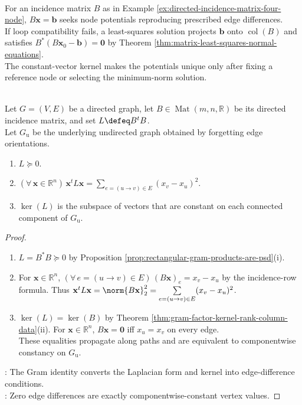 \begin{perspective} \label{per:incidence-least-squares-ranking} \\
For an incidence matrix $B$ as in Example \ref{ex:directed-incidence-matrix-four-node}, $B\mathbf{x}=\mathbf{b}$ seeks node potentials reproducing prescribed edge differences.\\
If loop compatibility fails, a least-squares solution projects $\mathbf{b}$ onto $\operatorname{col}(B)$ and satisfies $B^*(B\mathbf{x}_0-\mathbf{b})=\mathbf{0}$ by Theorem \ref{thm:matrix-least-squares-normal-equations}.\\
The constant-vector kernel makes the potentials unique only after fixing a reference node or selecting the minimum-norm solution.
\end{perspective}

\begin{proposition} \label{prop:incidence-laplacian-positive-semidefinite} \\
Let $G=(V,E)$ be a directed graph, let $B\in\operatorname{Mat}(m,n,\mathbb{R})$ be its directed incidence matrix, and set $L\defeq B^tB$.\\
Let $G_{\mathrm{u}}$ be the underlying undirected graph obtained by forgetting edge orientations.
\begin{enumerate}[label=(\roman*)]
\setlength{\itemsep}{0pt}
\item $L\succeq0$.
\item $(\forall\,\mathbf{x}\in\mathbb{R}^n)\,\mathbf{x}^tL\mathbf{x}=\sum\limits_{e=(u\to v)\in E}(x_v-x_u)^2$.
\item $\ker(L)$ is the subspace of vectors that are constant on each connected component of $G_{\mathrm{u}}$.
\end{enumerate}
\begin{proof}
\begin{enumerate}[label=(\roman*)]
\setlength{\itemsep}{0pt}
\item $L=B^*B\succeq0$ by Proposition \ref{prop:rectangular-gram-products-are-psd}(i).
\item For $\mathbf{x}\in\mathbb{R}^n$, $(\forall\,e=(u\to v)\in E)\,(B\mathbf{x})_e=x_v-x_u$ by the incidence-row formula. Thus $\mathbf{x}^tL\mathbf{x}=\norm{B\mathbf{x}}_2^2=\sum\limits_{e=(u\to v)\in E}(x_v-x_u)^2$.
\item $\ker(L)=\ker(B)$ by Theorem \ref{thm:gram-factor-kernel-rank-column-data}(ii). For $\mathbf{x}\in\mathbb{R}^n$, $B\mathbf{x}=\mathbf{0}$ iff $x_u=x_v$ on every edge.\\
These equalities propagate along paths and are equivalent to componentwise constancy on $G_{\mathrm{u}}$.
\end{enumerate}
: The Gram identity converts the Laplacian form and kernel into edge-difference conditions.\\
: Zero edge differences are exactly componentwise-constant vertex values.
\end{proof}
\end{proposition}

